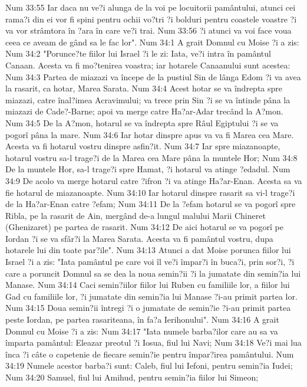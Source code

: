 Num 33:55  Iar daca nu ve?i alunga de la voi pe locuitorii pamântului, atunci cei rama?i din ei vor fi spini pentru ochii vo?tri ?i bolduri pentru coastele voastre ?i va vor strâmtora în ?ara în care ve?i trai.
Num 33:56  ?i atunci va voi face voua ceea ce aveam de gând sa le fac lor".
Num 34:1  A grait Domnul cu Moise ?i a zis:
Num 34:2  "Porunce?te fiilor lui Israel ?i le zi: Iata, ve?i intra în pamântul Canaan. Acesta va fi mo?tenirea voastra; iar hotarele Canaanului sunt acestea:
Num 34:3  Partea de miazazi va începe de la pustiul Sin de lânga Edom ?i va avea la rasarit, ca hotar, Marea Sarata.
Num 34:4  Acest hotar se va îndrepta spre miazazi, catre înal?imea Acravimului; va trece prin Sin ?i se va întinde pâna la miazazi de Cade?-Barne; apoi va merge catre Ha?ar-Adar trecând la A?mon.
Num 34:5  De la A?mon, hotarul se va îndrepta spre Râul Egiptului ?i se va pogorî pâna la mare.
Num 34:6  Iar hotar dinspre apus va va fi Marea cea Mare. Acesta va fi hotarul vostru dinspre asfin?it.
Num 34:7  Iar spre miazanoapte, hotarul vostru sa-l trage?i de la Marea cea Mare pâna la muntele Hor;
Num 34:8  De la muntele Hor, sa-l trage?i spre Hamat, ?i hotarul va atinge ?edadul.
Num 34:9  De acolo va merge hotarul catre ?ifron ?i va atinge Ha?ar-Enan. Acesta sa va fie hotarul de miazanoapte.
Num 34:10  Iar hotarul dinspre rasarit sa vi-l trage?i de la Ha?ar-Enan catre ?efam;
Num 34:11  De la ?efam hotarul se va pogorî spre Ribla, pe la rasarit de Ain, mergând de-a lungul malului Marii Chineret (Ghenizaret) pe partea de rasarit.
Num 34:12  De aici hotarul se va pogorî pe Iordan ?i se va sfâr?i la Marea Sarata. Acesta va fi pamântul vostru, dupa hotarele lui din toate par?ile".
Num 34:13  Atunci a dat Moise porunca fiilor lui Israel ?i a zis: "Iata pamântul pe care voi îl ve?i împar?i în buca?i, prin sor?i, ?i care a poruncit Domnul sa se dea la noua semin?ii ?i la jumatate din semin?ia lui Manase.
Num 34:14  Caci semin?iilor fiilor lui Ruben cu familiile lor, a fiilor lui Gad cu familiile lor, ?i jumatate din semin?ia lui Manase ?i-au primit partea lor.
Num 34:15  Doua semin?ii întregi ?i o jumatate de semin?ie ?i-au primit partea peste Iordan, pe partea rasariteana, în fa?a Ierihonului".
Num 34:16  A grait Domnul cu Moise ?i a zis:
Num 34:17  "Iata numele barba?ilor care au sa va împarta pamântul: Eleazar preotul ?i Iosua, fiul lui Navi;
Num 34:18  Ve?i mai lua înca ?i câte o capetenie de fiecare semin?ie pentru împar?irea pamântului.
Num 34:19  Numele acestor barba?i sunt: Caleb, fiul lui Iefoni, pentru semin?ia Iudei;
Num 34:20  Samuel, fiul lui Amihud, pentru semin?ia fiilor lui Simeon;
